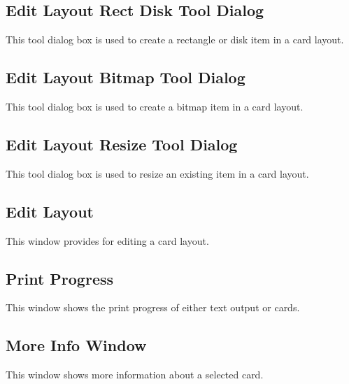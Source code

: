\subsection{Edit Layout Rect Disk Tool Dialog}
This tool dialog box is used to create a rectangle or disk item in a
card layout.
\subsection{Edit Layout Bitmap Tool Dialog}
This tool dialog box is used to create a bitmap item in a card layout.
\subsection{Edit Layout Resize Tool Dialog}
This tool dialog box is used to resize an existing item in a card layout.
\subsection{Edit Layout}
This window provides for editing a card layout.
\subsection{Print Progress}
This window shows the print progress of either text output or cards.
\subsection{More Info Window}
This window shows more information about a selected card.


